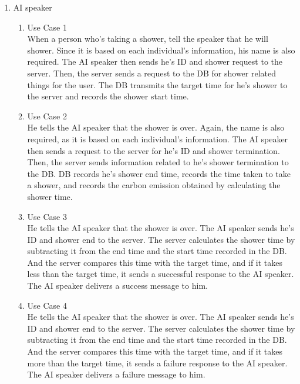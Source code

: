 \documentclass[11pt, conference]{IEEEtran}
\begin{document}
\begin{enumerate}[label=\arabic*]
    \item {\large{AI speaker}}
    \begin{enumerate}[label=\alph*]
        \item Use Case 1\\
        When a person who's taking a shower, tell the speaker that he will shower. Since it is based on each individual's information, his name is also required. The AI speaker then sends he's ID and shower request to the server. Then, the server sends a request to the DB for shower related things for the user. The DB transmits the target time for he's shower to the server and records the shower start time.
        \item Use Case 2\\
        He tells the AI speaker that the shower is over. Again, the name is also required, as it is based on each individual's information. The AI speaker then sends a request to the server for he's ID and shower termination. Then, the server sends information related to he's shower termination to the DB. DB records he's shower end time, records the time taken to take a shower, and records the carbon emission obtained by calculating the shower time.
        \item Use Case 3\\
        He tells the AI speaker that the shower is over. The AI speaker sends he's ID and shower end to the server. The server calculates the shower time by subtracting it from the end time and the start time recorded in the DB. And the server compares this time with the target time, and if it takes less than the target time, it sends a successful response to the AI speaker. The AI speaker delivers a success message to him. 
        \item Use Case 4\\
        He tells the AI speaker that the shower is over. The AI speaker sends he's ID and shower end to the server. The server calculates the shower time by subtracting it from the end time and the start time recorded in the DB. And the server compares this time with the target time, and if it takes more than the target time, it sends a failure response to the AI speaker. The AI speaker delivers a failure message to him.
    \end{enumerate}
\end{enumerate}
\end{document}
